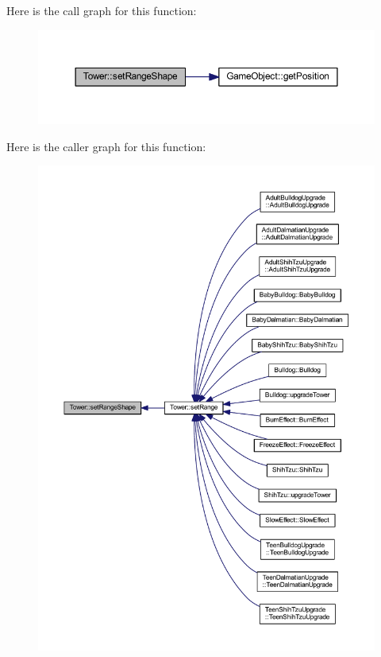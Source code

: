 Here is the call graph for this function\+:
\nopagebreak
\begin{figure}[H]
\begin{center}
\leavevmode
\includegraphics[width=350pt]{class_tower_ab91ce57d4ab80bd2aa03e6f4b68ef1a8_cgraph}
\end{center}
\end{figure}




Here is the caller graph for this function\+:
\nopagebreak
\begin{figure}[H]
\begin{center}
\leavevmode
\includegraphics[width=350pt]{class_tower_ab91ce57d4ab80bd2aa03e6f4b68ef1a8_icgraph}
\end{center}
\end{figure}


